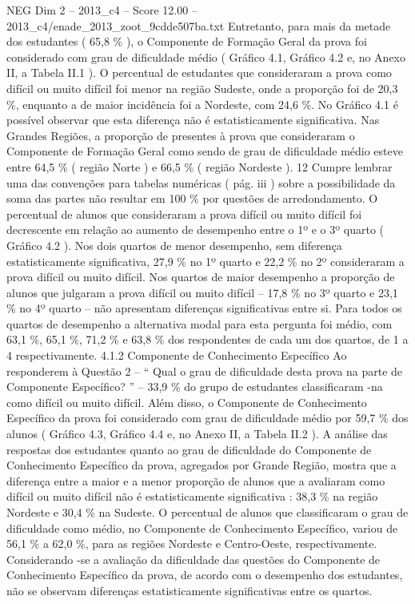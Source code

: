 \begin{textsample}{NEG Dim 2 – 2013\_c4 – Score 12.00 – 2013\_c4/enade\_2013\_zoot\_9cdde507ba.txt}
Entretanto, para mais da metade dos estudantes ( 65,8 \% ), o Componente de Formação Geral da prova foi considerado com grau de dificuldade médio ( Gráfico 4.1, Gráfico 4.2 e, no Anexo II, a Tabela II.1 ).
O percentual de estudantes que consideraram a prova como difícil ou muito difícil foi menor na região Sudeste, onde a proporção foi de 20,3 \%, enquanto a de maior incidência foi a Nordeste, com 24,6 \%.
No Gráfico 4.1 é possível observar que esta diferença não é estatisticamente significativa.
Nas Grandes Regiões, a proporção de presentes à prova que consideraram o Componente de Formação Geral como sendo de grau de dificuldade médio esteve entre 64,5 \% ( região Norte ) e 66,5 \% ( região Nordeste ). 12 Cumpre lembrar uma das convenções para tabelas numéricas ( pág. iii ) sobre a possibilidade da soma das partes não resultar em 100 \% por questões de arredondamento.
O percentual de alunos que consideraram a prova difícil ou muito difícil foi decrescente em relação ao aumento de desempenho entre o 1º e o 3º quarto ( Gráfico 4.2 ).
Nos dois quartos de menor desempenho, sem diferença estatisticamente significativa, 27,9 \% no 1º quarto e 22,2 \% no 2º consideraram a prova difícil ou muito difícil.
Nos quartos de maior desempenho a proporção de alunos que julgaram a prova difícil ou muito difícil – 17,8 \% no 3º quarto e 23,1 \% no 4º quarto – não apresentam diferenças significativas entre si.
Para todos os quartos de desempenho a alternativa modal para esta pergunta foi médio, com 63,1 \%, 65,1 \%, 71,2 \% e 63,8 \% dos respondentes de cada um dos quartos, de 1 a 4 respectivamente. 4.1.2 Componente de Conhecimento Específico Ao responderem à Questão 2 – “ Qual o grau de dificuldade desta prova na parte de Componente Específico? ” – 33,9 \% do grupo de estudantes classificaram -na como difícil ou muito difícil.
Além disso, o Componente de Conhecimento Específico da prova foi considerado com grau de dificuldade médio por 59,7 \% dos alunos ( Gráfico 4.3, Gráfico 4.4 e, no Anexo II, a Tabela II.2 ).
A análise das respostas dos estudantes quanto ao grau de dificuldade do Componente de Conhecimento Específico da prova, agregados por Grande Região, mostra que a diferença entre a maior e a menor proporção de alunos que a avaliaram como difícil ou muito difícil não é estatisticamente significativa : 38,3 \% na região Nordeste e 30,4 \% na Sudeste.
O percentual de alunos que classificaram o grau de dificuldade como médio, no Componente de Conhecimento Específico, variou de 56,1 \% a 62,0 \%, para as regiões Nordeste e Centro-Oeste, respectivamente.
Considerando -se a avaliação da dificuldade das questões do Componente de Conhecimento Específico da prova, de acordo com o desempenho dos estudantes, não se observam diferenças estatisticamente significativas entre os quartos.

\end{textsample}
